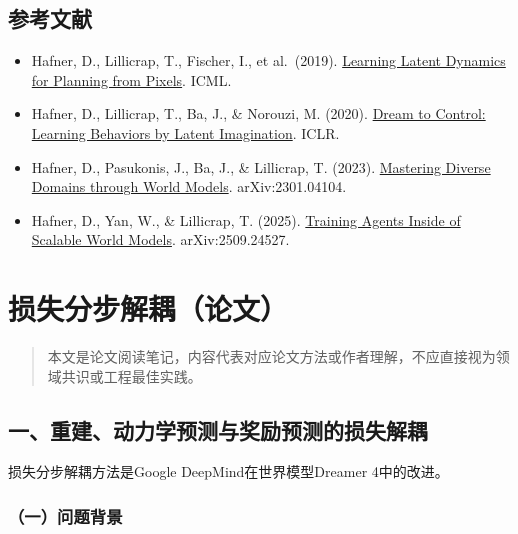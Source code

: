 \hypertarget{ux53c2ux8003ux6587ux732e-184}{%
\subsection{参考文献}\label{ux53c2ux8003ux6587ux732e-184}}

\begin{itemize}
\tightlist
\item
  Hafner, D., Lillicrap, T., Fischer, I., et al.~(2019). \href{https://arxiv.org/abs/1811.04551}{Learning Latent Dynamics for Planning from Pixels}. ICML.
\item
  Hafner, D., Lillicrap, T., Ba, J., \& Norouzi, M. (2020). \href{https://arxiv.org/abs/1912.01603}{Dream to Control: Learning Behaviors by Latent Imagination}. ICLR.
\item
  Hafner, D., Pasukonis, J., Ba, J., \& Lillicrap, T. (2023). \href{https://arxiv.org/abs/2301.04104}{Mastering Diverse Domains through World Models}. arXiv:2301.04104.
\item
  Hafner, D., Yan, W., \& Lillicrap, T. (2025). \href{https://arxiv.org/abs/2509.24527}{Training Agents Inside of Scalable World Models}. arXiv:2509.24527.
\end{itemize}

\clearpage

\hypertarget{ux635fux5931ux5206ux6b65ux89e3ux8026ux8bbaux6587}{%
\section{损失分步解耦（论文）}\label{ux635fux5931ux5206ux6b65ux89e3ux8026ux8bbaux6587}}

\begin{quote}
本文是论文阅读笔记，内容代表对应论文方法或作者理解，不应直接视为领域共识或工程最佳实践。
\end{quote}

\hypertarget{ux4e00ux91cdux5efaux52a8ux529bux5b66ux9884ux6d4bux4e0eux5956ux52b1ux9884ux6d4bux7684ux635fux5931ux89e3ux8026}{%
\subsection{一、重建、动力学预测与奖励预测的损失解耦}\label{ux4e00ux91cdux5efaux52a8ux529bux5b66ux9884ux6d4bux4e0eux5956ux52b1ux9884ux6d4bux7684ux635fux5931ux89e3ux8026}}

损失分步解耦方法是Google DeepMind在世界模型Dreamer 4中的改进。

\hypertarget{ux4e00ux95eeux9898ux80ccux666f-10}{%
\subsubsection{（一）问题背景}\label{ux4e00ux95eeux9898ux80ccux666f-10}}

